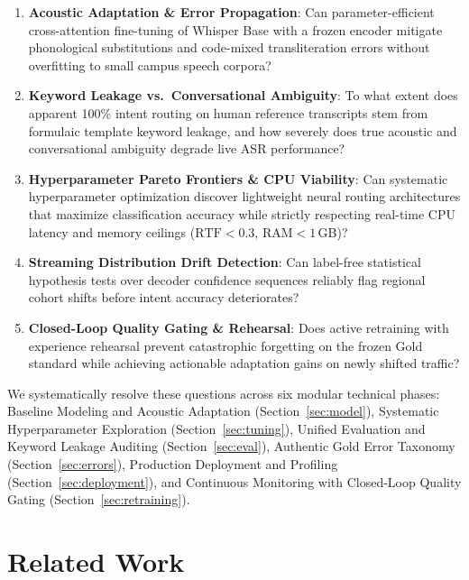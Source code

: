 \documentclass[sigconf,authordraft]{acmart}
\begin{document}
\begin{enumerate}
  \item \textbf{Acoustic Adaptation \& Error Propagation}: Can parameter-efficient cross-attention
    fine-tuning of Whisper Base with a frozen encoder mitigate phonological substitutions and code-mixed
    transliteration errors without overfitting to small campus speech corpora?
  \item \textbf{Keyword Leakage vs.\ Conversational Ambiguity}: To what extent does apparent 100\%
    intent routing on human reference transcripts stem from formulaic template keyword leakage, and
    how severely does true acoustic and conversational ambiguity degrade live ASR performance?
  \item \textbf{Hyperparameter Pareto Frontiers \& CPU Viability}: Can systematic hyperparameter
    optimization discover lightweight neural routing architectures that maximize classification accuracy
    while strictly respecting real-time CPU latency and memory ceilings ($\text{RTF} < 0.3$, $\text{RAM} < 1$\,GB)?
  \item \textbf{Streaming Distribution Drift Detection}: Can label-free statistical hypothesis
    tests over decoder confidence sequences reliably flag regional cohort shifts before intent
    accuracy deteriorates?
  \item \textbf{Closed-Loop Quality Gating \& Rehearsal}: Does active retraining with experience
    rehearsal prevent catastrophic forgetting on the frozen Gold standard while achieving actionable
    adaptation gains on newly shifted traffic?
\end{enumerate}

We systematically resolve these questions across six modular technical phases: Baseline Modeling and
Acoustic Adaptation (Section~\ref{sec:model}), Systematic Hyperparameter Exploration (Section~\ref{sec:tuning}),
Unified Evaluation and Keyword Leakage Auditing (Section~\ref{sec:eval}), Authentic Gold Error Taxonomy
(Section~\ref{sec:errors}), Production Deployment and Profiling (Section~\ref{sec:deployment}), and Continuous
Monitoring with Closed-Loop Quality Gating (Section~\ref{sec:retraining}).

\section{Related Work}
\label{sec:related}
\end{document}
